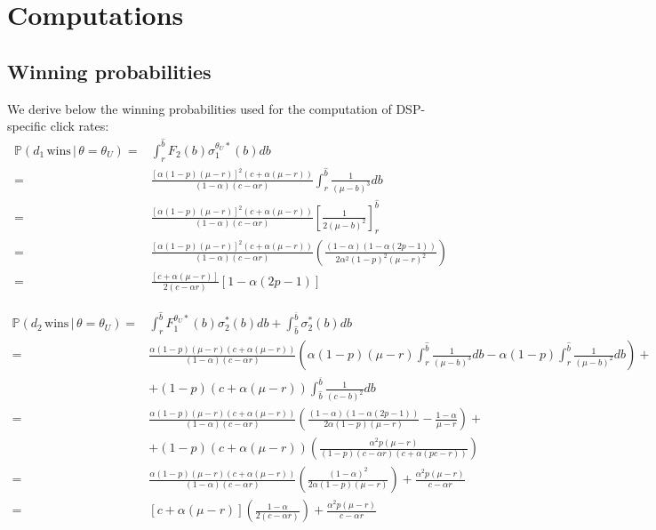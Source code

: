 \documentclass[11pt]{article}
\theoremstyle{plain}
\theoremstyle{definition}
\theoremstyle{plain}
\theoremstyle{plain}
\theoremstyle{plain}
\theoremstyle{plain}
\numberwithin{equation}{section}
\begin{document}
\section{Computations}\label{computations}
\subsection{Winning probabilities}
We derive below the winning probabilities used for the computation of DSP-specific click rates:
\begin{align*}
    \mathbb{P}(d_1 \, \text{wins} \, | \, \theta = \theta_U) = & \int_{r}^{\hat{b}} F_2(b)\sigma_1^{\theta_U *}(b) db \\[5pt]
    = & \frac{\left[\alpha(1-p)(\mu-r)\right]^2(c+\alpha(\mu-r))}{(1-\alpha)(c-\alpha r)} \int_{r}^{\hat{b}} \frac{1}{(\mu-b)^3} db \\[5pt]
    = & \frac{\left[\alpha(1-p)(\mu-r)\right]^2(c+\alpha(\mu-r))}{(1-\alpha)(c-\alpha r)} \left[ \frac{1}{2(\mu-b)^2}\right]^{\hat{b}}_{r} \\[5pt]
    = & \frac{\left[\alpha(1-p)(\mu-r)\right]^2(c+\alpha(\mu-r))}{(1-\alpha)(c-\alpha r)} \left( \frac{(1-\alpha)(1-\alpha(2p-1))}{2\alpha^2(1-p)^2(\mu-r)^2} \right) \\[5pt]
    = & \frac{[c+\alpha(\mu-r)]}{2(c-\alpha r)} [1-\alpha(2p-1)]
\end{align*}

{\footnotesize
\begin{align*}
    \mathbb{P}(d_2 \, \text{wins} \, | \, \theta = \theta_U) = & \int_{r}^{\hat{b}} F_1^{\theta_U *}(b)\sigma_2^*(b) db + \int_{\hat{b}}^{\overline{b}}\sigma_2^*(b)db \\[5pt]
    = & \frac{\alpha(1-p)(\mu-r)(c+\alpha(\mu-r))}{(1-\alpha)(c-\alpha r)} \left( \alpha(1-p)(\mu-r)\int_{r}^{\hat{b}}\frac{1}{(\mu-b)^3}db - \alpha(1-p)\int_{r}^{\hat{b}}\frac{1}{(\mu-b)^2}db\right) + \\[5pt]
    & + (1-p)(c+\alpha(\mu-r))\int_{\hat{b}}^{\overline{b}}\frac{1}{(c-b)^2}db \\[5pt]
    = & \frac{\alpha(1-p)(\mu-r)(c+\alpha(\mu-r))}{(1-\alpha)(c-\alpha r)} \left( \frac{(1-\alpha)(1-\alpha(2p-1))}{2\alpha(1-p)(\mu-r)} - \frac{1-\alpha}{\mu-r}\right) + \\[5pt]
    & + (1-p)(c+\alpha(\mu-r)) \left(\frac{\alpha^2 p (\mu-r)}{(1-p)(c-\alpha r)(c+\alpha (p c -  r))}\right) \\[5pt]
    = & \frac{\alpha(1-p)(\mu-r)(c+\alpha(\mu-r))}{(1-\alpha)(c-\alpha r)} \left( \frac{(1-\alpha)^2}{2\alpha(1-p)(\mu-r)}\right) + \frac{\alpha^2 p (\mu-r)}{c-\alpha r}  \\[5pt]
    = & [c+\alpha(\mu-r)] \left( \frac{1-\alpha}{2(c-\alpha r)}\right) + \frac{\alpha^2 p (\mu-r)}{c-\alpha r}
\end{align*}
}
\end{document}
